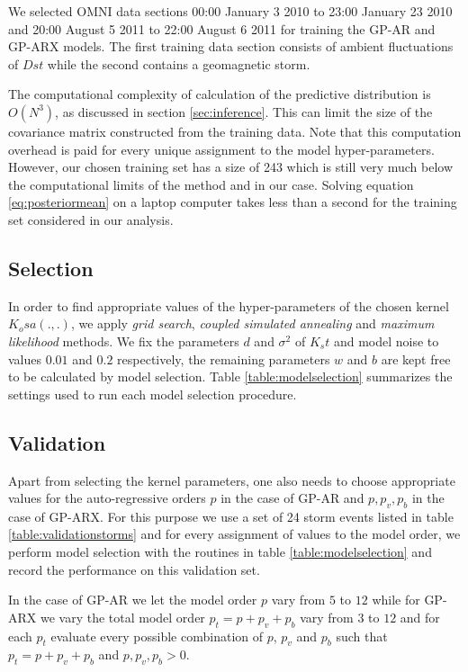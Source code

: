 \documentclass[sw, draft]{AGUTeX}
\begin{document}
\begin{article}
We selected OMNI data sections 00:00 January 3 2010 to 23:00 January 23 2010 and 20:00 August 5 2011 to 22:00 August 6 2011 for training the GP-AR and GP-ARX models. The first training data section consists of ambient fluctuations of $Dst$ while the second contains a geomagnetic storm.

The computational complexity of calculation of the predictive distribution is $O(N^3)$, as discussed in section \ref{sec:inference}. This can limit the size of the covariance matrix constructed from the training data. Note that this computation overhead is paid for every unique assignment to the model hyper-parameters. However, our chosen training set has a size of 243 which is still very much below the computational limits of the method and in our case. Solving equation \ref{eq:posteriormean} on a laptop computer takes less than a second for the training set considered in our analysis. 

\subsection*{Selection}

In order to find appropriate values of the hyper-parameters of the chosen kernel $K_osa(.,.)$, we apply \emph{grid search}, \emph{coupled simulated annealing} and \emph{maximum likelihood} methods. We fix the parameters $d$ and $\sigma^2$ of $K_st$ and model noise to values $0.01$ and $0.2$ respectively, the remaining parameters $w$ and $b$ are kept free to be calculated by model selection. Table \ref{table:modelselection} summarizes the settings used to run each model selection procedure.

\subsection*{Validation}

Apart from selecting the kernel parameters, one also needs to choose appropriate values for the auto-regressive orders $p$ in the case of GP-AR and $p, p_v, p_b$ in the case of GP-ARX. For this purpose we use a set of 24 storm events listed in table \ref{table:validationstorms} and for every assignment of values to the model order, we perform model selection with the routines in table \ref{table:modelselection} and record the performance on this validation set.

In the case of GP-AR we let the model order $p$ vary from $5$ to $12$ while for GP-ARX we vary the total model order $p_t = p + p_v + p_b$ vary from $3$ to $12$ and for each $p_t$ evaluate every possible combination of $p$, $p_v$ and $p_b$ such that $p_t = p + p_v + p_b$ and $p, p_{v}, p_b > 0$.


\end{article}
\end{document}
